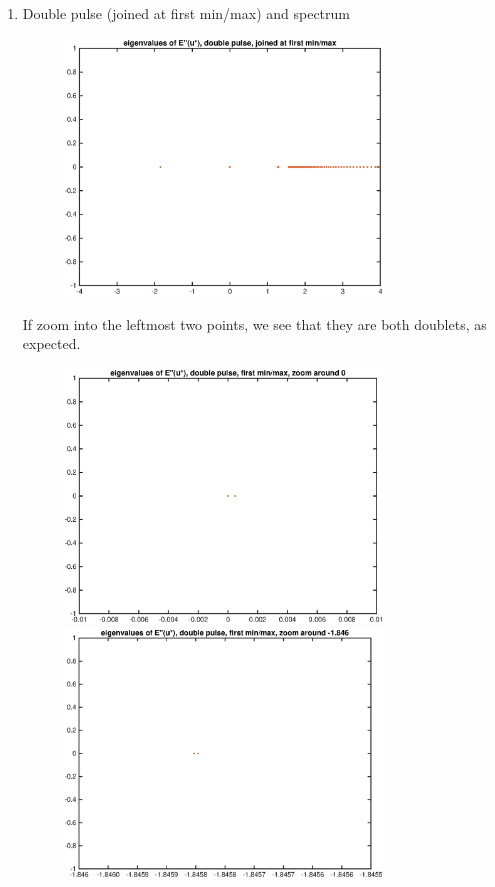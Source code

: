 \documentclass[12pt]{article}
\begin{document}
\begin{enumerate}
	\item Double pulse (joined at first min/max) and spectrum
	\begin{figure}[H]
	\includegraphics[width=8.5cm]{FDintEigs2.eps}
	\end{figure}
	If zoom into the leftmost two points, we see that they are both doublets, as expected.
	\begin{figure}[H]
	\includegraphics[width=8.5cm]{FDintEigs2Zoom1.eps}
	\includegraphics[width=8.5cm]{FDintEigs2Zoom2.eps}
	\end{figure}
\end{enumerate}
\end{document}
